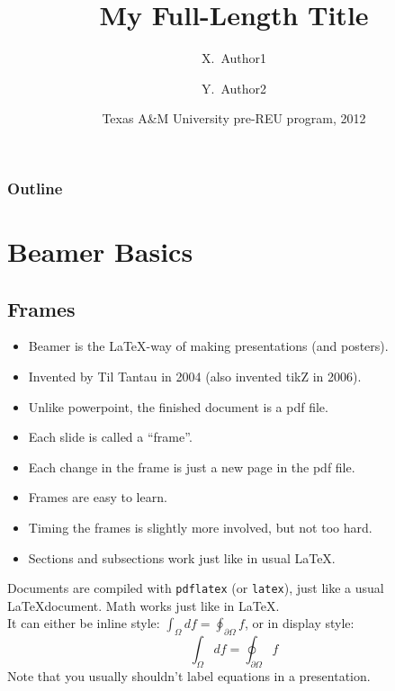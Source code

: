 \documentclass[leqno]{beamer}
\title[My Short Title]{My Full-Length Title}
\author[Author1, Author2]
{X.~Author1\inst{1} \and Y.~Author2\inst{2}}
\institute[Universities] %
{
  \inst{1}
  Department of Mathematics\\
  University of Author1
  \and
  \inst{2}
  Department of Engineering\\
  University of Author2
}
\date[TAMU pre-REU 2012]
{Texas A\&M University pre-REU program, 2012}
\begin{document}
\begin{frame}
  \titlepage
\end{frame}

\begin{frame}
  \frametitle{Outline}
  \tableofcontents
\end{frame}

\section{Beamer Basics}

\subsection{Frames}

\begin{frame} 
  \begin{itemize}[<+->]
   \item Beamer is the LaTeX-way of making presentations (and posters).
   \item Invented by Til Tantau in 2004 (also invented tikZ in 2006).
   \item Unlike powerpoint, the finished document is a pdf file.
   \item Each slide is called a ``frame''.
   \item Each change in the frame is just a new page in the pdf file.
   \item Frames are easy to learn.
   \item Timing the frames is slightly more involved, but not too hard.
   \item Sections and subsections work just like in usual \LaTeX.
  \end{itemize}
\end{frame}

\begin{frame} 
  Documents are compiled with \texttt{pdflatex} (or \texttt{latex}), just like a usual \LaTeX document.  
  \pause
  Math works just like in \LaTeX.  \\
  \pause
  It can either be inline style: $\int_\Omega df = \oint_{\partial\Omega} f$, or in display style:
  \begin{equation*}
   \int_\Omega df = \oint_{\partial\Omega} f
  \end{equation*}
  \pause
  Note that you usually shouldn't label equations in a presentation.
\end{frame}
\end{document}
